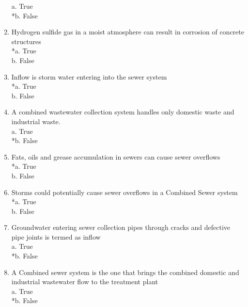 \begin{enumerate}
a. True \\
*b. False \\

\item  Hydrogen sulfide gas in a moist atmosphere can result in corrosion of concrete structures \\

*a. True \\
b. False \\

\item  Inflow is storm water entering into the sewer system \\

*a. True \\
b. False \\

\item  A combined wastewater collection system handles only domestic waste and industrial waste. \\

a. True \\
*b. False \\

\item  Fats, oils and grease accumulation in sewers can cause sewer overflows \\

*a. True \\
b. False \\

\item  Storms could potentially cause sewer overflows in a Combined Sewer system  \\

*a. True \\
b. False \\

\item  Groundwater entering sewer collection pipes through cracks and defective pipe joints is termed as inflow \\

a. True \\
*b. False \\

\item  A Combined sewer system is the one that brings the combined domestic and industrial wastewater flow to the treatment plant \\

a. True \\
*b. False \\


\end{enumerate}
